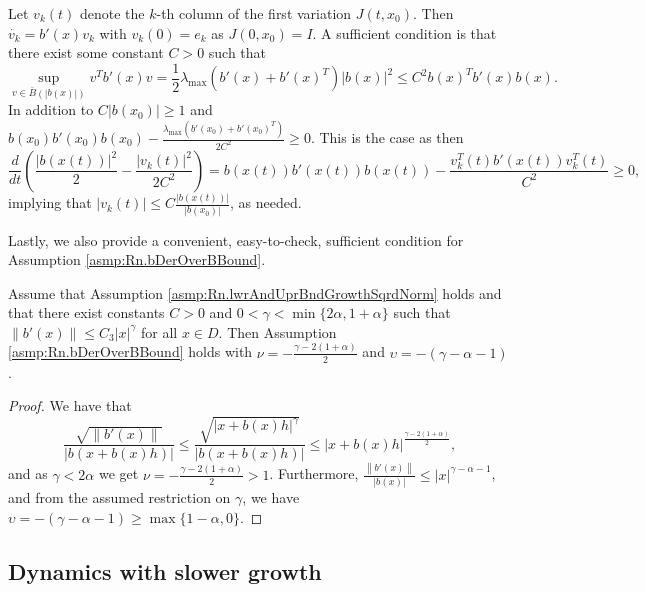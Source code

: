 \documentclass[a4paper, oneside, reqno]{amsart}
\newcommand{\abs}[1]{\left\lvert#1\right\rvert}
\newcommand{\norm}[1]{\left\|#1\right\|}
\theoremstyle{remark}
\begin{document}
\begin{remark}
   \label{rem:suffCondAsmpFirstVar}
   Let \(v_{k}(t)\) denote the \(k\)-th column of the first variation \(J(t,x_0)\).
   Then \(\dot{v_k} = b'(x)v_k\) with \(v_k(0) = e_k\) as \(J(0,x_0) = I\). 
   A sufficient condition is that there exist some constant \(C > 0\) such that
   \begin{equation}
          \label{eq:suffCondAssmpFirstVar}
          \underset{v\in \bar B\left(\abs{b(x)}\right)}{\sup} v^Tb'(x)v = \frac{1}{2}\lambda_{\max}\left(b'(x)+b'(x)^T\right)\abs{b(x)}^2\leq C^2b(x)^Tb'(x)b(x).
   \end{equation}
   In addition to \(C\abs{b(x_0)}\geq 1\) and \(b(x_0)b'(x_0)b(x_0) - \frac{\lambda_{\max}(b'(x_0)+b'(x_0)^T)}{2C^2}\geq 0\). 
   This is the case as then 
   \[\frac{d}{dt}\left(\frac{\abs{b(x(t))}^2}{2} - \frac{\abs{v_k(t)}^2}{2C^2}\right) = b(x(t))b'(x(t))b(x(t)) - \frac{v_k^T(t)b'(x(t))v_k^T(t)}{C^2} \geq 0,\] 
   implying that \(\abs{v_k(t)} \leq C\frac{\abs{b(x(t))}}{\abs{b(x_0)}}\), as needed. 
\end{remark}

Lastly, we also provide a convenient, easy-to-check, sufficient condition for Assumption \ref{asmp:Rn.bDerOverBBound}.

\begin{lemma}
\label{lemma:suffCondAsmpbDerOverBBound}
Assume that Assumption \ref{asmp:Rn.lwrAndUprBndGrowthSqrdNorm} holds and that there exist constants \(C>0\) and \(0<\gamma <\min\{2\alpha, 1+\alpha\}\) such that \(\norm{b'(x)}\leq C_3\abs{x}^{\gamma}\) for all \(x \in D\). Then Assumption \ref{asmp:Rn.bDerOverBBound} holds with \(\nu = -\frac{\gamma-2(1+\alpha)}{2}\) and \(\upsilon = -(\gamma-\alpha-1)\).
\end{lemma}
\begin{proof}
    We have that
    \[\frac{\sqrt{\norm{b'(x)}}}{\abs{b(x+b(x)h)}} \leq \frac{\sqrt{\abs{x+b(x)h}^{\gamma}}}{\abs{b(x+b(x)h)}} \leq \abs{x+b(x)h}^{\frac{\gamma-2(1+\alpha)}{2}},\]
    and as \(\gamma < 2\alpha\) we get \(\nu=-\frac{\gamma-2(1+\alpha)}{2}>1\). Furthermore, \(\frac{\norm{b'(x)}}{\abs{b(x)}} \leq \abs{x}^{\gamma-\alpha-1}\), and from the assumed restriction on \(\gamma\), we have \(\upsilon = -(\gamma-\alpha-1) \geq\max\{1-\alpha,0\}\).
\end{proof}

\subsection{Dynamics with slower growth}
\label{sec:RnLogDyn}
\end{document}
